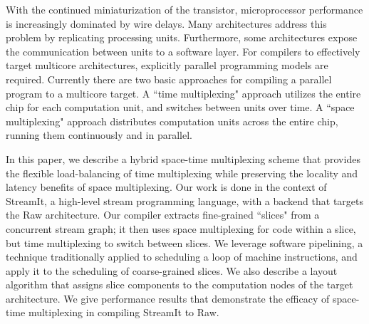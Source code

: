 With the continued miniaturization of the transistor, microprocessor
performance is increasingly dominated by wire delays.  Many
architectures address this problem by replicating processing units.
Furthermore, some architectures expose the communication between units
to a software layer.  For compilers to effectively target multicore
architectures, explicitly parallel programming models are required.
Currently there are two basic approaches for compiling a parallel
program to a multicore target.  A ``time multiplexing" approach
utilizes the entire chip for each computation unit, and switches
between units over time.  A ``space multiplexing" approach distributes
computation units across the entire chip, running them continuously
and in parallel.

In this paper, we describe a hybrid space-time multiplexing scheme
that provides the flexible load-balancing of time multiplexing while
preserving the locality and latency benefits of space multiplexing.
Our work is done in the context of StreamIt, a high-level stream
programming language, with a backend that targets the Raw
architecture.  Our compiler extracts fine-grained ``slices" from a
concurrent stream graph; it then uses space multiplexing for code
within a slice, but time multiplexing to switch between slices. We
leverage software pipelining, a technique traditionally applied to
scheduling a loop of machine instructions, and apply it to the
scheduling of coarse-grained slices.  We also describe a layout
algorithm that assigns slice components to the computation nodes of
the target architecture.  We give performance results that demonstrate
the efficacy of space-time multiplexing in compiling StreamIt to Raw.
